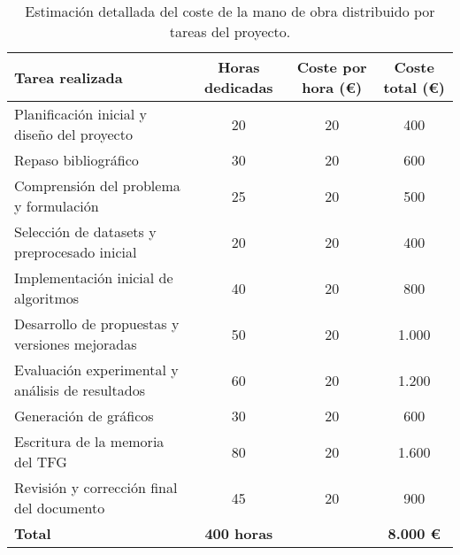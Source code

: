 \begin{table}[htp]
    \centering
    \begin{adjustbox}{width=\linewidth}
        \begin{tabular}{|l|c|c|c|}
            \hline
            \textbf{Tarea realizada}                         & \textbf{Horas dedicadas} & \textbf{Coste por hora (€)} & \textbf{Coste total (€)} \\ \hline
            Planificación inicial y diseño del proyecto      & 20                        & 20                           & 400                      \\
            Repaso bibliográfico                             & 30                        & 20                           & 600                      \\
            Comprensión del problema y formulación           & 25                        & 20                           & 500                      \\
            Selección de datasets y preprocesado inicial     & 20                        & 20                           & 400                      \\
            Implementación inicial de algoritmos             & 40                        & 20                           & 800                      \\
            Desarrollo de propuestas y versiones mejoradas   & 50                        & 20                           & 1.000                    \\
            Evaluación experimental y análisis de resultados & 60                        & 20                           & 1.200                    \\
            Generación de gráficos                           & 30                        & 20                           & 600                      \\
            Escritura de la memoria del TFG                  & 80                        & 20                           & 1.600                    \\
            Revisión y corrección final del documento        & 45                        & 20                           & 900                      \\ \hline
            \textbf{Total}                                   & \textbf{400 horas}        &                              & \textbf{8.000 €}         \\ \hline
        \end{tabular}
    \end{adjustbox}
    \caption{Estimación detallada del coste de la mano de obra distribuido por tareas del proyecto.}
    \label{tab:mano-de-obra}
\end{table}



